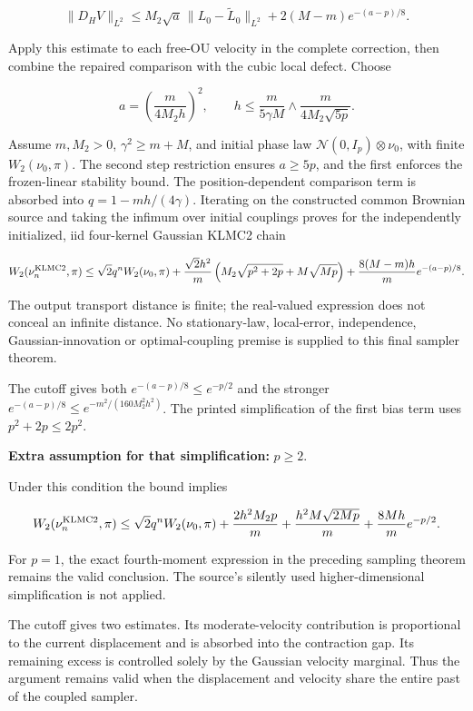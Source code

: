 \documentclass[11pt,a4paper]{article}
\begin{document}
\[\|D_HV\|_{L^2}\le M_2\sqrt a\,\|L_0-\widetilde L_0\|_{L^2}
+2(M-m)e^{-(a-p)/8}.\]


Apply this estimate to each free-OU velocity in the complete
correction, then combine the repaired comparison with the cubic local
defect. Choose


\[a=\left(\frac{m}{4M_2h}\right)^2,\qquad
h\le\frac{m}{5\gamma M}\wedge\frac{m}{4M_2\sqrt{5p}}.\]


Assume \(m,M_2>0\), \(\gamma^2\ge m+M\), and initial phase law
\(\mathcal N(0,I_p)\otimes\nu_0\), with finite \(W_2(\nu_0,\pi)\).
The second step restriction ensures \(a\ge5p\), and the first enforces the
frozen-linear stability bound. The position-dependent comparison term is
absorbed into \(q=1-mh/(4\gamma)\). Iterating on the constructed common
Brownian source and taking the infimum over initial couplings proves
for the independently initialized, iid four-kernel Gaussian KLMC2 chain


\[W_2(\nu_n^{\rm KLMC2},\pi)\le
\sqrt2q^n W_2(\nu_0,\pi)
+\frac{\sqrt2h^2}{m}\left(M_2\sqrt{p^2+2p}+M\sqrt{Mp}\right)
+\frac{8(M-m)h}{m}e^{-(a-p)/8}.\]


The output transport distance is finite; the real-valued expression
does not conceal an infinite distance. No stationary-law, local-error,
independence, Gaussian-innovation or optimal-coupling premise is supplied to
this final sampler theorem.




The cutoff gives both \(e^{-(a-p)/8}\le e^{-p/2}\) and the stronger
\(e^{-(a-p)/8}\le e^{-m^2/(160M_2^2h^2)}\). The printed simplification
of the first bias term uses \(p^2+2p\le2p^2\).




\textbf{Extra assumption for that simplification:} \(p\ge2\).




Under this condition the bound implies


\[W_2(\nu_n^{\rm KLMC2},\pi)\le
\sqrt2q^n W_2(\nu_0,\pi)
+\frac{2h^2M_2p}{m}+\frac{h^2M\sqrt{2Mp}}m
+\frac{8Mh}{m}e^{-p/2}.\]


For \(p=1\), the exact fourth-moment expression in the preceding
sampling theorem remains the valid conclusion. The source's silently used
higher-dimensional simplification is not applied.



The cutoff gives two estimates. Its moderate-velocity contribution is proportional to the current displacement and is absorbed into the contraction gap. Its remaining excess is controlled solely by the Gaussian velocity marginal. Thus the argument remains valid when the displacement and velocity share the entire past of the coupled sampler.
\end{document}
